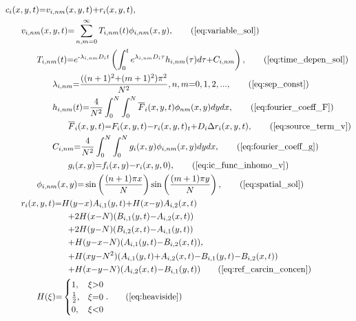 \documentclass[\main/thesis.tex]{subfiles}
\begin{document}
\begin{align}
&c_i(x, y, t) {=} v_{i,nm}(x, y, t) {+} r_i(x, y, t),
\label{eq:carcin_sol}\\
&\hspace{0.25in}v_{i,nm}(x, y, t) {=} \sum_{n,m{=}0}^{\infty} T_{i,nm}(t) \phi_{i,nm}(x, y), \tag{\ref{eq:variable_sol}}\\
&\hspace{0.5in}T_{i,nm}(t) {=} e^{\minus\lambda_{i,nm} D_i t} \left( \int_{0}^{t} e^{\lambda_{i,nm} D_i \tau} h_{i,nm}(\tau) d\tau {+} C_{i,nm} \right), \tag{\ref{eq:time_depen_sol}}\\
&\hspace{0.75in}\lambda_{i, nm} {=} \frac{((n+1)^2 {+} (m+1)^2)\pi^2}{N^2}, n,m {=} 0, 1, 2, ..., \tag{\ref{eq:sep_const}}\\
&\hspace{0.75in}h_{i,nm}(t) {=} \frac{4}{N^2} \int_{0}^{N} \int_{0}^{N} \overline{F}_i(x, y, t) \phi_{nm}(x, y) dy dx, \tag{\ref{eq:fourier_coeff_F}}\\
&\hspace{1in}\overline{F}_i(x, y, t) {=} F_i(x, y, t) {-} r_i(x, y, t)_t {+} D_i\Delta r_i(x, y, t), \tag{\ref{eq:source_term_v}} \\
&\hspace{0.75in}C_{i,nm} {=} \frac{4}{N^2} \int_{0}^{N} \int_{0}^{N} g_i(x, y) \phi_{i,nm}(x, y) dy dx, \tag{\ref{eq:fourier_coeff_g}}\\
&\hspace{1in}g_i(x, y) {=} f_i(x, y) {-} r_i(x, y, 0), \tag{\ref{eq:ic_func_inhomo_v}}\\
&\hspace{0.5in}\phi_{i,nm}(x, y) {=} \sin\left( \frac{(n+1)\pi x}{N} \right) \sin\left( \frac{(m+1)\pi y}{N} \right), \tag{\ref{eq:spatial_sol}}\\
&\hspace{0.25in}r_i(x, y, t) {=} H(y{-}x)A_{i, 1}(y, t) {+} H(x{-}y)A_{i, 2}(x, t) \nonumber\\
&\hspace{1in}{+} 2H(x{-}N)(B_{i, 1}(y, t) {-} A_{i, 2}(x, t)) \nonumber\\
&\hspace{1in}{+} 2H(y{-}N)(B_{i, 2}(x, t) {-} A_{i, 1}(y, t)) \nonumber\\
&\hspace{1in}{+} H(y{-}x{-}N)(A_{i, 1}(y, t) {-} B_{i, 2}(x, t)), \nonumber\\
&\hspace{1in}{+} H(xy{-}N^2)(A_{i, 1}(y, t) {+} A_{i, 2}(x, t) {-} B_{i, 1}(y, t) {-} B_{i, 2}(x, t)) \nonumber\\
&\hspace{1in}{+} H(x{-}y{-}N)(A_{i, 2}(x, t) {-} B_{i, 1}(y, t)) \tag{\ref{eq:ref_carcin_concen}}\\
&\hspace{0.5in}H(\xi) {=} \begin{cases}
1, &\xi {>} 0 \\
\frac{1}{2}, &\xi {=} 0 \\
0, &\xi {<} 0
\end{cases}. \tag{\ref{eq:heaviside}}\\
\end{align}
\end{document}
